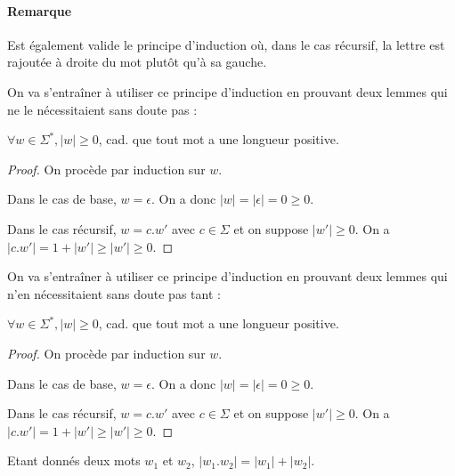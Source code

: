\paragraph*{Remarque} Est également valide le principe d'induction où, dans le cas récursif, la lettre est rajoutée à droite du mot plutôt qu'à sa gauche.

On va s'entraîner à utiliser ce principe d'induction en prouvant deux lemmes qui ne le nécessitaient sans doute pas :

\begin{lemma}
$\forall w \in \Sigma^*, |w| \geq 0$, cad. que tout mot a une longueur positive.
\end{lemma}
\begin{proof}
On procède par induction sur $w$.

Dans le cas de base, $w = \epsilon$. On a donc $|w| = |\epsilon| = 0 \geq 0$.

Dans le cas récursif, $w = c.w'$ avec $c \in \Sigma$ et on suppose $|w'| \geq 0$. On a $|c.w'| = 1 + |w'| \geq |w'| \geq 0$.
\end{proof}

On va s'entraîner à utiliser ce principe d'induction en prouvant deux lemmes qui n'en nécessitaient sans doute pas tant :

\begin{lemma}
$\forall w \in \Sigma^*, |w| \geq 0$, cad. que tout mot a une longueur positive.
\end{lemma}
\begin{proof}
On procède par induction sur $w$.

Dans le cas de base, $w = \epsilon$. On a donc $|w| = |\epsilon| = 0 \geq 0$.

Dans le cas récursif, $w = c.w'$ avec $c \in \Sigma$ et on suppose $|w'| \geq 0$. On a $|c.w'| = 1 + |w'| \geq |w'| \geq 0$.
\end{proof}

\begin{lemma}
Etant donnés deux mots $w_1$ et $w_2$, $|w_1.w_2| = |w_1| + |w_2|$. 
\end{lemma}

